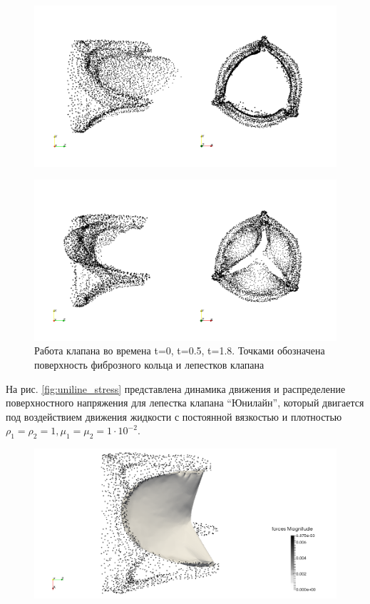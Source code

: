 \begin{figure}[htbp]
\centering
\includegraphics{uniline_dynamics_22.png}
\caption{}
\end{figure}

\begin{figure}[htbp]
\centering
\includegraphics{uniline_dynamics_33.png}
\caption{\label{fig:uniline_dynamics}Работа клапана во времена t=0,
t=0.5, t=1.8. Точками обозначена поверхность фиброзного кольца и
лепестков клапана}
\end{figure}

На рис. \ref{fig:uniline_stress} представлена динамика движения и
распределение поверхностного напряжения для лепестка клапана
``Юнилайн'', который двигается под воздействием движения жидкости с
постоянной вязкостью и плотностью
\(\rho_1=\rho_2=1, \mu_1=\mu_2=1 \cdot 10^{-2}\).

\begin{figure}[htbp]
\centering
\includegraphics{uniline_stress_1.png}
\caption{}
\end{figure}

